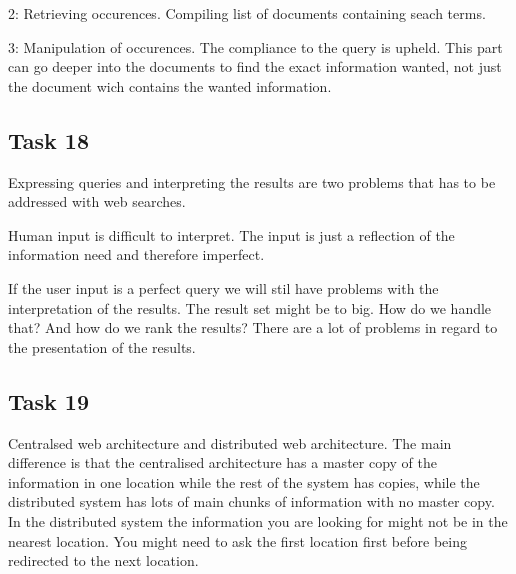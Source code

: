 \documentclass[12pt, a4paper]{article}
\begin{document}
2: Retrieving occurences. Compiling list of documents containing seach terms. 

3: Manipulation of occurences. The compliance to the query is upheld. This part can go deeper into the documents to find the exact information wanted, not just the document wich contains the wanted information. 

\subsection{Task 18}
Expressing queries and interpreting the results are two problems that has to be addressed with web searches. 

Human input is difficult to interpret. The input is just a reflection of the information need and therefore imperfect. 

If the user input is a perfect query we will stil have problems with the interpretation of the results. The result set might be to big. How do we handle that? And how do we rank the results? There are a lot of problems in regard to the presentation of the results. 

\subsection{Task 19}
Centralsed web architecture and distributed web architecture. 
The main difference is that the centralised architecture has a master copy of the information in one location while the rest of the system has copies, while the distributed system has lots of main chunks of information with no master copy. In the distributed system the information you are looking for might not be in the nearest location. You might need to ask the first location first before being redirected to the next location. 
\end{document}
